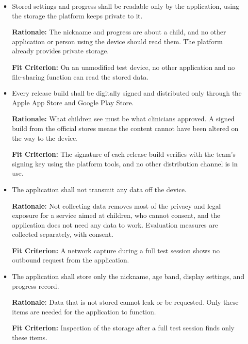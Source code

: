 \documentclass[12pt]{article}
\newcounter{nfrnum} %
\begin{document}
\begin{itemize}

\item[\refstepcounter{nfrnum}\textbf{NFR\thenfrnum}\label{NFR_DataProtection}:]
Stored settings and progress shall be readable only by the application, using the storage the platform keeps private to it.

\textbf{Rationale:} The nickname and progress are about a child, and no other application or person using the device should read them. The platform already provides private storage.

\textbf{Fit Criterion:} On an unmodified test device, no other application and no file-sharing function can read the stored data.

\item[\refstepcounter{nfrnum}\textbf{NFR\thenfrnum}\label{NFR_Integrity}:]
Every release build shall be digitally signed and distributed only through the Apple App Store and Google Play Store.

\textbf{Rationale:} What children see must be what clinicians approved. A signed build from the official stores means the content cannot have been altered on the way to the device.

\textbf{Fit Criterion:} The signature of each release build verifies with the team's signing key using the platform tools, and no other distribution channel is in use.

\item[\refstepcounter{nfrnum}\textbf{NFR\thenfrnum}\label{NFR_Privacy}:]
The application shall not transmit any data off the device.

\textbf{Rationale:} Not collecting data removes most of the privacy and legal exposure for a service aimed at children, who cannot consent, and the application does not need any data to work. Evaluation measures are collected separately, with consent.

\textbf{Fit Criterion:} A network capture during a full test session shows no outbound request from the application.

\item[\refstepcounter{nfrnum}\textbf{NFR\thenfrnum}\label{NFR_Minimization}:]
The application shall store only the nickname, age band, display settings, and progress record.

\textbf{Rationale:} Data that is not stored cannot leak or be requested. Only these items are needed for the application to function.

\textbf{Fit Criterion:} Inspection of the storage after a full test session finds only these items.


\end{itemize}
\end{document}
